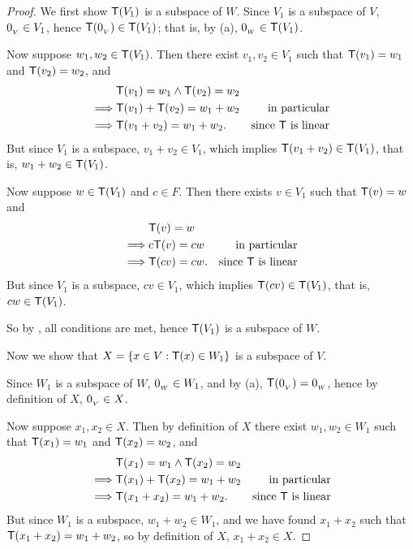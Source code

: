 \begin{proof}
We first show \(\textsf{T}(V_1)\) is a subspace of \(W\).
Since \(V_1\) is a subspace of \(V\), \(0_{_V} \in V_1\), hence \(\textsf{T}(0_{_V}) \in \textsf{T}(V_1)\);
that is, by (a), \(0_{_W} \in \textsf{T}(V_1)\).

Now suppose \(w_1, w_2 \in \textsf{T}(V_1)\).
Then there exist \(v_1, v_2 \in V_1\) such that \(\textsf{T}(v_1) = w_1\) and \(\textsf{T}(v_2) = w_2\), and
\begin{align*}
             & \textsf{T}(v_1) = w_1 \land \textsf{T}(v_2) = w_2 \\
    \implies & \textsf{T}(v_1) + \textsf{T}(v_2) = w_1 + w_2 & \text{in particular} \\
    \implies & \textsf{T}(v_1 + v_2) = w_1 + w_2. & \text{since \(\textsf{T}\) is linear}
\end{align*}
But since \(V_1\) is a subspace, \(v_1 + v_2 \in V_1\), which implies \(\textsf{T}(v_1 + v_2) \in \textsf{T}(V_1)\), that is, \(w_1 + w_2 \in \textsf{T}(V_1)\).

Now suppose \(w \in \textsf{T}(V_1)\) and \(c \in F\).
Then there exists \(v \in V_1\) such that \(\textsf{T}(v) = w\) and
\begin{align*}
             & \textsf{T}(v) = w \\
    \implies & c\textsf{T}(v) = cw & \text{in particular} \\
    \implies & \textsf{T}(cv) = cw. & \text{since \(\textsf{T}\) is linear}
\end{align*}
But since \(V_1\) is a subspace, \(cv \in V_1\), which implies \(\textsf{T}(cv) \in \textsf{T}(V_1)\), that is, \(cw \in \textsf{T}(V_1)\).

So by , all conditions are met, hence \(\textsf{T}(V_1)\) is a subspace of \(W\).

Now we show that \(X = \{ x \in V: \textsf{T}(x) \in W_1 \}\) is a subspace of \(V\).

Since \(W_1\) is a subspace of \(W\), \(0_{_W} \in W_1\), and by (a), \(\textsf{T}(0_{_V}) = 0_{_W}\), hence by definition of \(X\), \(0_{_V} \in X\).

Now suppose \(x_1, x_2 \in X\).
Then by definition of \(X\) there exist \(w_1, w_2 \in W_1\) such that \(\textsf{T}(x_1) = w_1\) and \(\textsf{T}(x_2) = w_2\), and
\begin{align*}
             & \textsf{T}(x_1) = w_1 \land \textsf{T}(x_2) = w_2 \\
    \implies & \textsf{T}(x_1) + \textsf{T}(x_2) = w_1 + w_2 & \text{in particular} \\
    \implies & \textsf{T}(x_1 + x_2) = w_1 + w_2. & \text{since \(\textsf{T}\) is linear}
\end{align*}
But since \(W_1\) is a subspace, \(w_1 + w_2 \in W_1\), and we have found \(x_1 + x_2\) such that \(\textsf{T}(x_1 + x_2) = w_1 + w_2\), so by definition of \(X\), \(x_1 + x_2 \in X\).


\end{proof}
